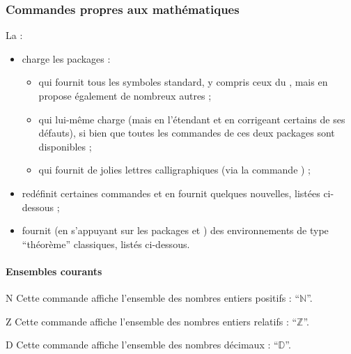 
\subsubsection{Commandes propres aux mathématiques}
\label{sec:comm-propr-aux}

La \gztauthorcl{} :
\begin{itemize}
\item charge les packages :
  \begin{itemize}
  \item {} qui fournit tous les symboles standard, y compris
    ceux du , mais en propose également de nombreux autres ;
  \item {} qui lui-même charge  (mais en
    l'étendant et en corrigeant certains de ses défauts), si bien que toutes les
    commandes de ces deux packages sont disponibles ;
  \item {} qui fournit de jolies lettres calligraphiques (via
    la commande ) ;
  \end{itemize}
\item redéfinit certaines commandes et en fournit quelques nouvelles, listées
  ci-dessous ;
\item fournit (en s'appuyant sur les packages  et
  ) des environnements de type \enquote{théorème} classiques,
  listés ci-dessous.
\end{itemize}

\paragraph{Ensembles courants}

\begin{docCommand}{N}{}
  Cette commande affiche l'ensemble des nombres entiers positifs :
  \enquote{$\mathbb{N}$}.
\end{docCommand}

\begin{docCommand}{Z}{}
  Cette commande affiche l'ensemble des nombres entiers relatifs :
  \enquote{$\mathbb{Z}$}.
\end{docCommand}

\begin{docCommand}{D}{}
  Cette commande affiche l'ensemble des nombres décimaux :
  \enquote{$\mathbb{D}$}.
\end{docCommand}

